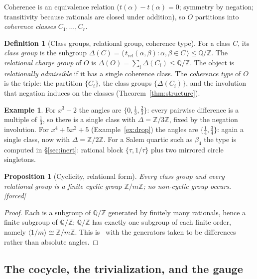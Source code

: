 \documentclass[11pt]{article}
\theoremstyle{plain}
\newtheorem{proposition}[theorem]{Proposition}
\theoremstyle{definition}
\newtheorem{definition}[theorem]{Definition}
\newtheorem{example}[theorem]{Example}
\theoremstyle{remark}
\newcommand{\Q}{\mathbb{Q}}
\newcommand{\Z}{\mathbb{Z}}
\newcommand{\tors}{\Q/\Z}
\newcommand{\F}{\textnormal{[forced]}}
\begin{document}
Coherence is an equivalence relation ($t(\alpha)-t(\alpha)=0$; symmetry by
negation; transitivity because rationals are closed under addition), so $O$
partitions into \emph{coherence classes} $C_1,\dots,C_r$.

\begin{definition}[Class groups, relational group, coherence type]\label{def:type}
For a class $C$, its \emph{class group} is the subgroup
$\Delta(C)=\langle\,t_{\mathrm{rel}}(\alpha,\beta):\alpha,\beta\in
C\,\rangle\le\tors$. The \emph{relational charge group} of $O$ is
$\Delta(O)=\sum_i\Delta(C_i)\le\tors$. The object is \emph{relationally
admissible} if it has a single coherence class. The \emph{coherence type} of $O$
is the triple: the partition $\{C_i\}$, the class groups $\{\Delta(C_i)\}$, and
the involution that negation induces on the classes
(Theorem~\ref{thm:structure}).
\end{definition}

\begin{example}\label{ex:firsttype}
For $x^3-2$ the angles are $\{0,\tfrac13,\tfrac23\}$: every pairwise
difference is a multiple of $\tfrac13$, so there is a single class with
$\Delta=\Z/3\Z$, fixed by the negation involution. For $x^4+5x^2+5$
(Example~\ref{ex:drop}) the angles are $\{\tfrac14,\tfrac34\}$: again a
single class, now with $\Delta=\Z/2\Z$. For a Salem quartic such as
$\beta_4$ the type is computed in \S\ref{sec:inert}: rational block
$\{\tau,1/\tau\}$ plus two mirrored circle singletons.
\end{example}

\begin{proposition}[Cyclicity, relational form]\label{prop:cyclic}
Every class group and every relational group is a finite cyclic group $\Z/m\Z$;
no non-cyclic group occurs. \F
\end{proposition}

\begin{proof}
Each is a subgroup of $\tors$ generated by finitely many rationals, hence a finite
subgroup of $\tors$; $\tors$ has exactly one subgroup of each finite order,
namely $\langle 1/m\rangle\cong\Z/m\Z$. This is~\cite[Thm.~3.1]{CMC} with the
generators taken to be differences rather than absolute angles.
\end{proof}

\subsection{The cocycle, the trivialization, and the gauge}
\end{document}
